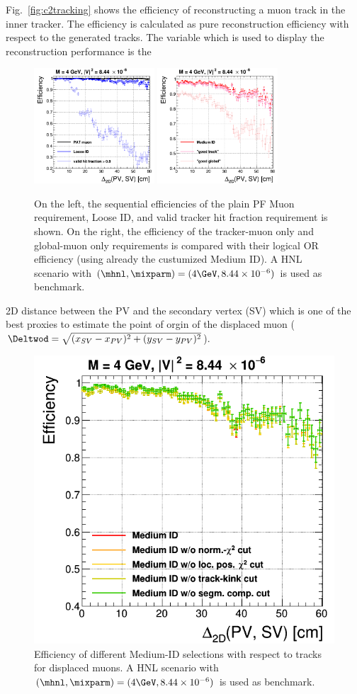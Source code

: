 Fig.~\ref{fig:c2tracking} shows the efficiency of
reconstructing a muon track in the inner tracker. The efficiency is
calculated as pure reconstruction efficiency with respect to the
generated tracks. The variable which is used to display the reconstruction
performance is the 
\begin{figure}[h]
\centering
  \includegraphics[width=0.4\textwidth]{Figures/c6/object/loose_validFraction_M-4_V-0p00290516780927_rho.png}
  \includegraphics[width=0.4\textwidth]{Figures/c6/object/goodTrack_goodGlobal_M-4_V-0p00290516780927_rho.png}
  \caption{On the left, the sequential
efficiencies of the plain PF Muon requirement, Loose ID, and
valid tracker hit fraction requirement is shown. On the right, the efficiency of the tracker-muon only and
    global-muon only requirements is compared with their logical OR
    efficiency (using already the custumized Medium ID). A HNL scenario with
    $(\mhnl,\mixparm)=(4\GeV,8.44\times10^{-6})$ is used as
    benchmark. \dani}
  \label{fig:c2tracking2}
\end{figure}
2D distance between the PV and the secondary vertex (SV)
which is one of the best proxies to estimate the point of orgin of the
displaced muon ($\Deltwod = \sqrt{(x_{SV}-x_{PV})^{2} +
  (y_{SV}-y_{PV})^{2}}$).
\begin{figure}
\includegraphics[width=.4\textwidth]{Figures/c6/object/globalTrack_cuts_M-4_V-0p00290516780927_rho.png}
  \caption{Efficiency of different Medium-ID selections with respect to tracks for displaced
muons. A HNL scenario with
    $(\mhnl,\mixparm)=(4\GeV,8.44\times10^{-6})$ is used as
    benchmark. \dani}
  \label{fig:c2tracking3}
\end{figure} 
